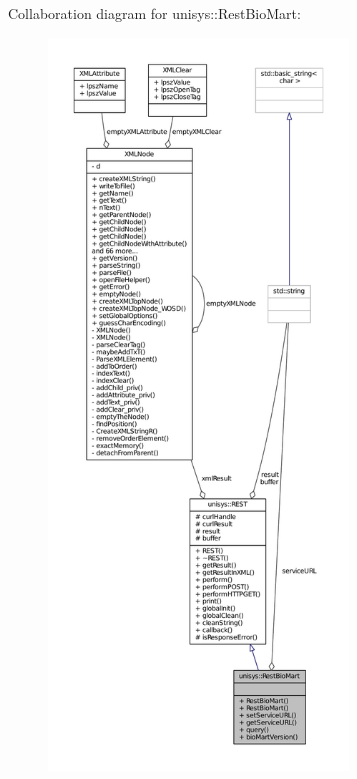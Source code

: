Collaboration diagram for unisys\-:\-:Rest\-Bio\-Mart\-:
\nopagebreak
\begin{figure}[H]
\begin{center}
\leavevmode
\includegraphics[height=550pt]{classunisys_1_1RestBioMart__coll__graph}
\end{center}
\end{figure}
